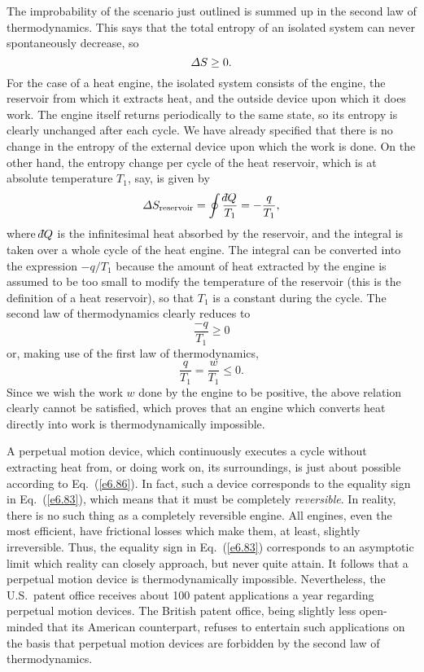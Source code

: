 The improbability of the scenario just outlined is summed up in the second law
of thermodynamics. This says that the total entropy of an isolated system
can never spontaneously decrease, so
\begin{equation}
{\mit\Delta} S \geq 0.\label{e6.83}
\end{equation}
For the case of a heat engine, the isolated system consists of the engine, the
reservoir from which it extracts heat, and the outside device upon which it
does work. The engine itself returns periodically 
to the same state, so its
entropy is clearly unchanged after each cycle. We have already specified that there
is no change in the  entropy of the external  device upon which the work is done. On
the other hand, the entropy change per cycle of the heat reservoir,
which is  at absolute temperature
$T_1$, say,  is given by 
\begin{equation}
{\mit\Delta} S_{\rm reservoir} = \oint \frac{\dbar Q}{T_1} = -\frac{q}{T_1},
\end{equation}
where $\dbar Q$ is the infinitesimal heat absorbed by the reservoir, and the integral
is taken over a whole cycle of the heat engine. The integral can be converted into
the expression $-q/T_1$ because the amount of heat extracted by the engine is
assumed to be too small to modify the temperature of the reservoir (this is
the definition of a heat reservoir), so that $T_1$ is a constant during the cycle.
The second law of thermodynamics clearly reduces to
\begin{equation}
\frac{-q}{T_1} \geq 0
\end{equation}
or, making use of the first law of thermodynamics,
\begin{equation}
\frac{q}{T_1} = \frac{w}{T_1} \leq 0.\label{e6.86}
\end{equation}
Since we wish  the work $w$ done by the engine to be positive, the above relation
clearly 
cannot be satisfied, which   proves that an engine which converts heat
directly into work is thermodynamically impossible. 

A perpetual motion device,
which continuously executes a cycle without extracting heat from, 
or doing work on, its surroundings,
is just about possible according to Eq.~(\ref{e6.86}). In fact, such a device
corresponds to the equality sign in Eq.~(\ref{e6.83}), which  
means that it must be completely
{\em reversible}. In reality, there is no such thing as a completely reversible engine.
All engines, even the most efficient, have frictional losses which make them,
 at least,
slightly irreversible. Thus, the equality sign in Eq.~(\ref{e6.83}) corresponds to 
an  asymptotic limit which reality can closely approach, but never quite attain.
It follows that  a perpetual motion device is  thermodynamically impossible.
Nevertheless, the U.S.\ patent office  receives about 100 patent
applications a year regarding perpetual motion devices. The British patent office,
being slightly less open-minded that its American counterpart, refuses to entertain
such applications on the basis that perpetual motion devices are forbidden by
the second law of thermodynamics.


